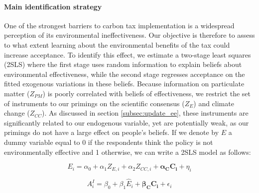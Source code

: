 \documentclass[12pt]{article} %
\begin{document}

\paragraph{Main identification strategy}

One of the strongest barriers to carbon tax implementation is a widespread perception of its environmental ineffectiveness. Our objective is therefore to assess to what extent learning about the environmental benefits of the tax could increase acceptance. To identify this effect, we estimate a two-stage least squares (2SLS) where the first stage uses random information to explain beliefs about environmental effectiveness, while the second stage regresses acceptance on the fitted exogenous variations in these beliefs. Because information on particulate matter ($Z_{PM}$) is poorly correlated with beliefs of effectiveness, we restrict the set of instruments to our primings on the scientific consensus ($Z_{E}$) and climate change ($Z_{CC}$). As discussed in section \ref{subsec:update_ee}, these instruments are significantly related to our endogenous variable, yet are potentially weak, as our primings do not have a large effect on people's beliefs. If we denote by $E$ a dummy variable equal to 0 if the respondents think the policy is not environmentally effective and 1 otherwise, we can write a 2SLS model as follows:

\begin{equation}
    E_i = \alpha_0 + \alpha_1 Z_{E,i} + \alpha_2 Z_{CC,i} + \mathbf{\alpha_C C_i}  + \eta_i
    \label{eq:first_stage_parametric_rdd_approve_effective}
\end{equation}

\vspace{-.5cm}

\begin{equation}
    A^I_i = \beta_0 + \beta_1 \widehat{E}_i + \mathbf{\beta_C C_i} + \epsilon_i
    \label{eq:second_stage_parametric_rdd_approve_effective}
\end{equation}

\vspace{.5cm}
\end{document}
